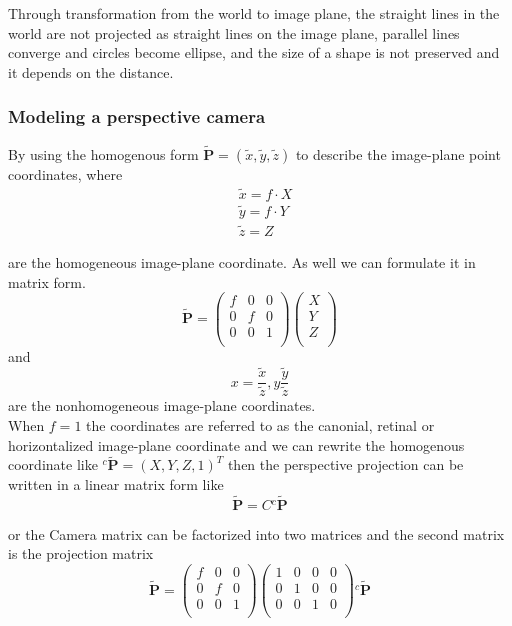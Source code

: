 \documentclass[journal,final,a4paper,twoside]{PS}
\begin{document}
Through transformation from the world to image plane, the straight lines in the world are not projected as straight lines on the image plane, parallel lines converge and circles become ellipse, and the size of a shape is not preserved and it depends on the distance.

\subsubsection{Modeling a perspective camera}
By using the homogenous form $\tilde{\textbf{P}}=(\tilde{x} ,\tilde{y} ,\tilde{z} )$ to describe the image-plane point coordinates, where \begin{subequations}\begin{align}
&\tilde{x}=f\cdot X\label{eq:homo_x}\\
&\tilde{y}=f\cdot Y\label{eq:homo_y}\\
&\tilde{z}=Z\label{eq:homo_z}
\end{align}
\end{subequations}


are the homogeneous image-plane coordinate. As well we can formulate it in matrix form\cite{Corke}.
\begin{equation}
\tilde{\textbf{P}} = \begin{pmatrix}
f&0&0\\
0&f&0\\
0&0&1\\
\end{pmatrix}
\begin{pmatrix}
X\\
Y\\
Z\\
\end{pmatrix}
\end{equation}
and
\begin{equation}
x=\frac{\tilde{x}}{\tilde{z}}, y \frac{\tilde{y}}{\tilde{z}}
\end{equation}
are the nonhomogeneous image-plane coordinates.
\\
When $f=1$ the coordinates are referred to as the canonial, retinal or horizontalized image-plane coordinate and we can rewrite the homogenous coordinate like $ {}^{c}\tilde{\textbf{P}} = (X,Y,Z,1)^T $
then the perspective projection can be written in a linear matrix form like
\begin{equation}
\tilde{\textbf{P}} = C{}^{c}\tilde{\textbf{P}}
\end{equation}

or the Camera matrix can be factorized into two matrices and the second matrix is the projection matrix 
\begin{equation}
\tilde{\textbf{P}} = \begin{pmatrix}
f&0&0\\
0&f&0\\
0&0&1\\
\end{pmatrix}\begin{pmatrix}
1&0&0&0\\
0&1&0&0\\
0&0&1&0\\
\end{pmatrix}{}^{c}\tilde{\textbf{P}}
\end{equation}
\end{document}
